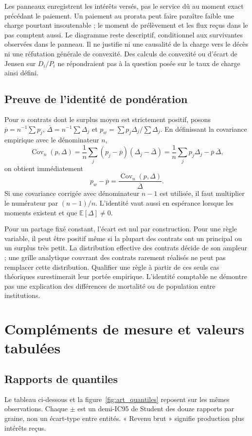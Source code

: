 Les panneaux enregistrent les intérêts versés, pas le service dû
au moment exact précédant le paiement. Un paiement au prorata peut
faire paraître faible une charge pourtant insoutenable ; le moment
de prélèvement et les flux reçus dans le pas comptent aussi.
Le diagramme reste descriptif, conditionnel aux survivantes observées
dans le panneau. Il ne justifie ni une causalité de la charge vers
le décès ni une réfutation générale de convexité. Des calculs de
convexité ou d'écart de Jensen sur $D_i/P_i$ ne répondraient pas
à la question posée sur le taux de charge ainsi défini.

\subsection{Preuve de l'identité de pondération}\label{sec:ponderation}
Pour $n$ contrats dont le surplus moyen est strictement positif,
posons $\overline p=n^{-1}\sum p_j$,
$\overline\Delta=n^{-1}\sum\Delta_j$ et
$p_w=\sum p_j\Delta_j/\sum\Delta_j$.
En définissant la covariance empirique avec le dénominateur $n$,
\[
 \operatorname{Cov}_n(p,\Delta)
 =\frac1n\sum_j(p_j-\overline p)(\Delta_j-\overline\Delta)
 =\frac1n\sum_jp_j\Delta_j-\overline p\,\overline\Delta,
\]
on obtient immédiatement
\begin{equation}
 p_w-\overline p=\frac{\operatorname{Cov}_n(p,\Delta)}{\overline\Delta}.
 \label{eq:identite}
\end{equation}
Si une covariance corrigée avec dénominateur $n-1$ est utilisée,
il faut multiplier le numérateur par $(n-1)/n$. L'identité vaut
aussi en espérance lorsque les moments existent et que
$\mathbb E[\Delta]\ne0$.

Pour un partage fixé constant, l'écart est nul par construction.
Pour une règle variable, il peut être positif même si la plupart
des contrats ont un principal ou un surplus très petit. La
distribution effective des contrats décide de son ampleur ; une
grille analytique couvrant des contrats rarement réalisés ne peut
pas remplacer cette distribution. Qualifier une règle à partir
de ces seuls cas théoriques surestimerait leur portée empirique.
L'identité comptable ne démontre pas une explication des différences
de mortalité ou de population entre institutions.

\section{Compléments de mesure et valeurs tabulées}\label{sec:tableaux}
\subsection{Rapports de quantiles}
Le tableau ci-dessous et la figure~\ref{fig:art_quantiles} reposent
sur les mêmes observations. Chaque $\pm$ est un demi-IC95 de
Student des douze rapports par graine, non un écart-type entre
entités. « Revenu brut » signifie production plus intérêts reçus.
\begin{small}\end{small}

